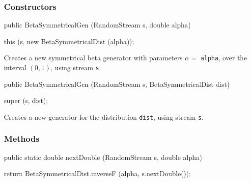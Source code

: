 \subsubsection* {Constructors}
\begin{code}

   public BetaSymmetricalGen (RandomStream s, double alpha) \begin{hide} {
      this (s, new BetaSymmetricalDist (alpha));
   }\end{hide}
\end{code}
\begin{tabb} Creates a new symmetrical beta generator with parameters $\alpha =$
  \texttt{alpha}, over the interval $(0,1)$, using stream \texttt{s}.
\end{tabb}
\begin{code}

   public BetaSymmetricalGen (RandomStream s, BetaSymmetricalDist dist) \begin{hide} {
      super (s, dist);
   }\end{hide}
\end{code}
  \begin{tabb} Creates a new generator for the distribution \texttt{dist},
     using stream \texttt{s}.
  \end{tabb}

\subsubsection* {Methods}
\begin{code}

   public static double nextDouble (RandomStream s, double alpha)\begin{hide} {
      return BetaSymmetricalDist.inverseF (alpha, s.nextDouble());
   }\end{hide}
\end{code}
\begin{code}\begin{hide}
}\end{hide}
\end{code}
